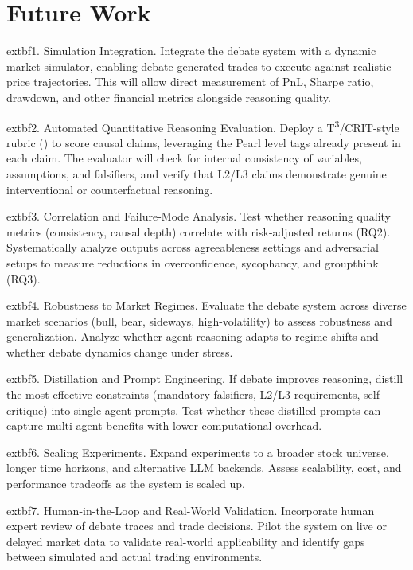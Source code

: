 \documentclass{article}
\begin{document}
\vspace{-6pt}
\section{Future Work}

	extbf{1. Simulation Integration.}
Integrate the debate system with a dynamic market simulator, enabling debate-generated trades to execute against realistic price trajectories. This will allow direct measurement of PnL, Sharpe ratio, drawdown, and other financial metrics alongside reasoning quality.

	extbf{2. Automated Quantitative Reasoning Evaluation.}
Deploy a T\textsuperscript{3}/CRIT-style rubric (\cite{chang2023crit,raudit}) to score causal claims, leveraging the Pearl level tags already present in each claim. The evaluator will check for internal consistency of variables, assumptions, and falsifiers, and verify that L2/L3 claims demonstrate genuine interventional or counterfactual reasoning.

	extbf{3. Correlation and Failure-Mode Analysis.}
Test whether reasoning quality metrics (consistency, causal depth) correlate with risk-adjusted returns (RQ2). Systematically analyze outputs across agreeableness settings and adversarial setups to measure reductions in overconfidence, sycophancy, and groupthink (RQ3).

	extbf{4. Robustness to Market Regimes.}
Evaluate the debate system across diverse market scenarios (bull, bear, sideways, high-volatility) to assess robustness and generalization. Analyze whether agent reasoning adapts to regime shifts and whether debate dynamics change under stress.

	extbf{5. Distillation and Prompt Engineering.}
If debate improves reasoning, distill the most effective constraints (mandatory falsifiers, L2/L3 requirements, self-critique) into single-agent prompts. Test whether these distilled prompts can capture multi-agent benefits with lower computational overhead.

	extbf{6. Scaling Experiments.}
Expand experiments to a broader stock universe, longer time horizons, and alternative LLM backends. Assess scalability, cost, and performance tradeoffs as the system is scaled up.

	extbf{7. Human-in-the-Loop and Real-World Validation.}
Incorporate human expert review of debate traces and trade decisions. Pilot the system on live or delayed market data to validate real-world applicability and identify gaps between simulated and actual trading environments.
\end{document}
